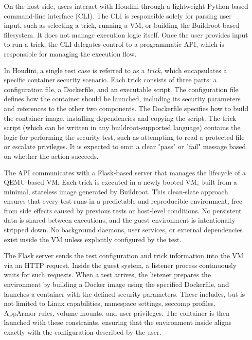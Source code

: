 \documentclass[12pt]{report}
\begin{document}
\begin{doublespace}
On the host side, users interact with Houdini through a lightweight Python-based command-line interface (CLI). The CLI is responsible solely for parsing user input, such as selecting a trick, running a VM, or building the Buildroot-based filesystem. It does not manage execution logic itself. Once the user provides input to run a trick, the CLI delegates control to a programmatic API, which is responsible for managing the execution flow.

In Houdini, a single test case is referred to as a \textit{trick}, which encapsulates a specific container security scenario. Each trick consists of three parts: a configuration file, a Dockerfile, and an executable script. The configuration file defines how the container should be launched, including its security parameters and references to the other two components. The Dockerfile specifies how to build the container image, installing dependencies and copying the script. The trick script (which can be written in any buildroot-supported language) contains the logic for performing the security test, such as attempting to read a protected file or escalate privileges. It is expected to emit a clear "pass" or "fail" message based on whether the action succeeds.

The API communicates with a Flask-based server that manages the lifecycle of a QEMU-based VM. Each trick is executed in a newly booted VM, built from a minimal, stateless image generated by Buildroot. This clean-slate approach ensures that every test runs in a predictable and reproducible environment, free from side effects caused by previous tests or host-level conditions. No persistent data is shared between executions, and the guest environment is intentionally stripped down. No background daemons, user services, or external dependencies exist inside the VM unless explicitly configured by the test.

The Flask server sends the test configuration and trick information into the VM via an HTTP request. Inside the guest system, a listener process continuously waits for such requests. When a test arrives, the listener prepares the environment by building a Docker image using the specified Dockerfile, and launches a container with the defined security parameters. These includes, but is not limited to Linux capabilities, namespace settings, seccomp profiles, AppArmor rules, volume mounts, and user privileges. The container is then launched with these constraints, ensuring that the environment inside aligns exactly with the configuration described by the user.


\end{doublespace}
\end{document}
